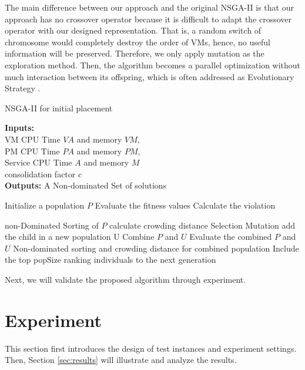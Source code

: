 The main difference between our approach and the original NSGA-II is that our approach has no crossover operator because it is difficult to adapt the crossover operator with our designed representation. That is, a random switch of chromosome would completely destroy the order of VMs, 
hence, no useful information will be preserved. 
Therefore, we only apply mutation as the exploration method. Then, the algorithm becomes a parallel optimization without much interaction between its offspring, which is often addressed as Evolutionary Strategy \cite{evo_str}.
\begin{algorithm}[!htb]
 \caption{NSGA-II for initial placement}
 \footnotesize
 \textbf{Inputs:} \\
  VM CPU Time $VA$ and memory $VM$, \\
  PM CPU Time $PA$ and memory $PM$, \\
  Service CPU Time $A$ and memory $M$ \\
  consolidation factor c \\
 \textbf{Outputs:}
  A Non-dominated Set of solutions

 \begin{algorithmic}[1]
  \STATE Initialize a population $P$
      \STATE Evaluate the fitness values
      \STATE Calculate the violation
    \ENDFOR

    \STATE non-Dominated Sorting of $P$
    \STATE calculate crowding distance
      \STATE Selection
      \STATE Mutation
      \STATE add the child in a new population U
    \ENDWHILE
    \STATE Combine $P$ and $U$ 
    \STATE Evaluate the combined $P$ and $U$
    \STATE Non-dominated sorting and crowding distance for combined population
    \STATE Include the top popSize ranking individuals to the next generation

  \ENDWHILE
 \end{algorithmic}
 \label{alg:NSGAII}
\end{algorithm}

Next, we will validate the proposed algorithm through experiment.

\section{Experiment}
\label{sec:exp}
This section first introduces the design of test instances and experiment settings. Then, Section \ref{sec:results} will illustrate and analyze the results. 

